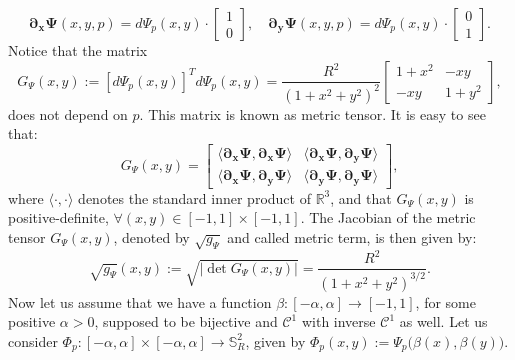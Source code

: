 \begin{equation*}
	\boldsymbol{\partial_x \Psi}(x,y,p) = d\Psi_{p}(x,y) \cdot
	\begin{bmatrix}
		 1 \\
		 0
	\end{bmatrix}, \quad
	\boldsymbol{\partial_y \Psi}(x,y,p) = d\Psi_{p}(x,y) \cdot
	\begin{bmatrix}
		 0 \\
		 1
	\end{bmatrix}.
\end{equation*}
Notice that the matrix
\begin{equation*}
	\label{chp-cs-eqdistant-Psitensor}
	G_{\Psi}(x,y) := 
	[d\Psi_{p}(x,y)]^Td\Psi_{p}(x,y)
	= \frac{R^2}{(1 + x^2 + y^2)^2}
	\begin{bmatrix}
		  1+ x^2 &  -xy \\
		 -xy & 1 + y^2
	\end{bmatrix},
\end{equation*}
does not depend on $p$.
This matrix is known as metric tensor.
It is easy to see that:
\begin{equation}
	\label{chp-cs-eqdistant-Psi-metric-tensor}
	G_{\Psi}(x,y) = 
	\begin{bmatrix}
		\langle  \boldsymbol{\partial_x \Psi}, \boldsymbol{\partial_x \Psi} \rangle & 
		\langle  \boldsymbol{\partial_x \Psi}, \boldsymbol{\partial_y \Psi} \rangle \\
		\langle  \boldsymbol{\partial_x \Psi}, \boldsymbol{\partial_y \Psi} \rangle  &
		\langle  \boldsymbol{\partial_y \Psi}, \boldsymbol{\partial_y \Psi} \rangle 
	\end{bmatrix},
\end{equation}
where $\langle \cdot, \cdot \rangle$ denotes 
the standard inner product of $\mathbb{R}^3$,
and that $G_{\Psi}(x,y)$ is positive-definite, 
$\forall (x,y) \in [-1,1]\times[-1,1]$.
The Jacobian of the metric tensor $G_{\Psi}(x,y)$, denoted by $\sqrt{g_{\Psi}}$ and called metric term, is then given by:
\begin{equation*}
        \sqrt{g_{\Psi}}(x,y) :=
	\sqrt{|\det{G_{\Psi}(x,y)}|} = \frac{R^2}{(1+x^2+y^2)^{3/2}}.
\end{equation*}
Now let us assume that we have a function $\beta:[-\alpha,\alpha] \to [-1,1]$, for some positive $\alpha>0$,
supposed to be bijective and $\mathcal{C}^1$ with inverse $\mathcal{C}^1$ as well.
Let us consider $\Phi_p: [-\alpha,\alpha]\times [-\alpha,\alpha] \to \mathbb{S}^2_R$,
given by $\Phi_p(x,y) := \Psi_p\big(\beta(x),\beta(y)\big)$.
